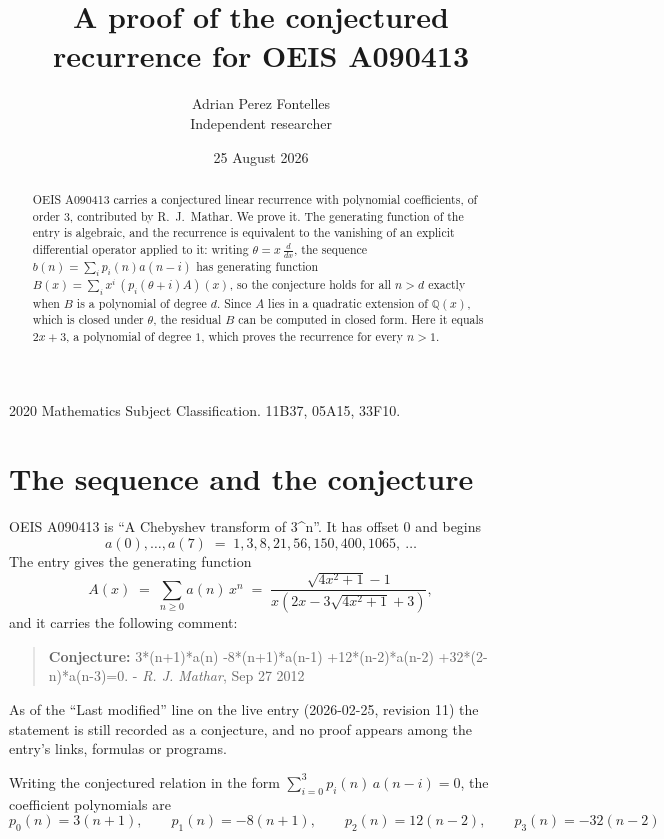 \documentclass[11pt,a4paper]{article}
\title{A proof of the conjectured recurrence for OEIS A090413}
\author{Adrian Perez Fontelles\\ \small Independent researcher}
\date{25 August 2026}
\theoremstyle{plain}
\theoremstyle{definition}
\begin{document}
\maketitle

\begin{abstract}
OEIS A090413 carries a conjectured linear recurrence with polynomial coefficients, of
order 3, contributed by R.~J.~Mathar. We prove it. The generating function of the
entry is algebraic, and the recurrence is equivalent to the vanishing of an explicit
differential operator applied to it: writing $\theta=x\,\frac{d}{dx}$, the sequence
$b(n)=\sum_{i}p_{i}(n)a(n-i)$ has generating function
$B(x)=\sum_{i}x^{i}\,(p_{i}(\theta+i)A)(x)$, so the conjecture holds for all $n>d$ exactly
when $B$ is a polynomial of degree $d$. Since $A$ lies in a quadratic extension of
$\mathbb{Q}(x)$, which is closed under $\theta$, the residual $B$ can be computed in
closed form. Here it equals $2 x + 3$, a polynomial of degree $1$, which proves
the recurrence for every $n>1$.
\end{abstract}

\noindent\small 2020 Mathematics Subject Classification. 11B37, 05A15, 33F10.\normalsize

\section{The sequence and the conjecture}

OEIS A090413 is ``A Chebyshev transform of 3\^{}n''. It has offset $0$ and begins
\[
a(0),\dots,a(7)\;=\;1, 3, 8, 21, 56, 150, 400, 1065,\ \dots
\]
The entry gives the generating function
\begin{equation}\label{eq:gf}
A(x)\;=\;\sum_{n\ge 0} a(n)\,x^{n}\;=\;\frac{\sqrt{4 x^{2} + 1} - 1}{x \left(2 x - 3 \sqrt{4 x^{2} + 1} + 3\right)} ,
\end{equation}
and it carries the following comment:
\begin{quote}\small
\textbf{Conjecture:} 3*(n+1)*a(n) -8*(n+1)*a(n-1) +12*(n-2)*a(n-2) +32*(2-n)*a(n-3)=0. - \emph{R. J. Mathar}, Sep 27 2012
\end{quote}
As of the ``Last modified'' line on the live entry (2026-02-25, revision 11) the
statement is still recorded as a conjecture, and no proof appears among the entry's links,
formulas or programs.

Writing the conjectured relation in the form $\sum_{i=0}^{3}p_{i}(n)\,a(n-i)=0$,
the coefficient polynomials are
\[
p_{0}(n)=3 \left(n + 1\right),\qquad p_{1}(n)=- 8 \left(n + 1\right),\qquad p_{2}(n)=12 \left(n - 2\right),\qquad p_{3}(n)=- 32 \left(n - 2\right)
\]
\end{document}
